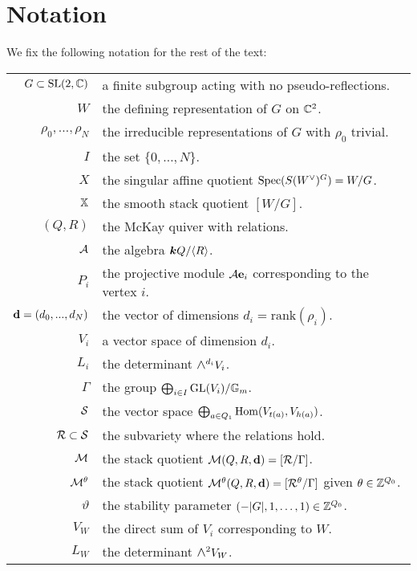 \documentclass{amsart}
\theoremstyle{definition}
\newcommand\pgap{\vspace{10pt}}
\newcommand{\Wedge}{\mbox{\scalebox{1.2}{$\wedge$}}}
\newcommand\VW{V_W}
\newcommand\W{W}
\begin{document}
\section*{Notation}
We fix the following notation for the rest of the text:
\pgap

\begin{centering}
\begin{tabular}{r l}
    $G \subset \operatorname{SL}(2,\mathbb{C})$ & a finite subgroup acting with no pseudo-reflections. \\
    $\W$ & the defining representation of $G$ on $\mathbb{C}^2$. \\
    $\rho_0, \ldots, \rho_N$ & the irreducible representations of $G$ with $\rho_0$ trivial. \\
    $I$ & the set $\{0,\ldots,N\}$.  \\
    $X$ & the singular affine quotient $\Spec(S(\W^\vee)^G) = \W/G$. \\
    $\mathbb{X}$ & the smooth stack quotient $[\W/G]$. \\
    $(Q,R)$ & the McKay quiver with relations. \\
    $\mathcal{A}$ & the algebra ${\boldsymbol{k}} Q/ \langle R\rangle$. \\
    $P_i$ & the projective module $\mathcal{A}\mathbf{e}_i$ corresponding to the vertex $i$. \\
    $\mathbf{d}=(d_0,..., d_N)$ & the vector of dimensions $d_i=\text{rank}(\rho_i)$. \\
    $V_i$ & a vector space of dimension $d_i$. \\
    $L_i$ & the determinant $\Wedge^{d_i} V_i$. \\
     $\Gamma$ & the group $\bigoplus_{i \in I} \text{GL}(V_i) / \mathbb{G}_m$. \\
    $\mathcal{S}$ & the vector space $\bigoplus_{a \in Q_1} \operatorname{Hom}(V_{t(a)}, V_{h(a)})$. \\
  $\mathcal{R}\subset \mathcal{S}$ & the subvariety where the relations hold. \\
    $\mathcal{M}$ & the stack quotient  $\mathcal{M}(Q,R,\mathbf{d})=[\mathcal{R}/\Gamma]$. \\
    $\mathcal{M}^\theta$ & the stack quotient $\mathcal{M}^\theta(Q,R,\mathbf{d})=[\mathcal{R}^\theta/\Gamma]$ given $\theta \in \mathbb{Z}^{Q_0}$. \\
    $\vartheta$ & the stability parameter $(-|G|,1, \ldots, 1) \in \mathbb{Z}^{Q_0}$. \\
   $\VW$ & the direct sum of $V_i$ corresponding to $W$. \\
    $L_W$ & the determinant $\Wedge^2 \VW$. \\
    \end{tabular}
\end{centering}
 
\end{document}
